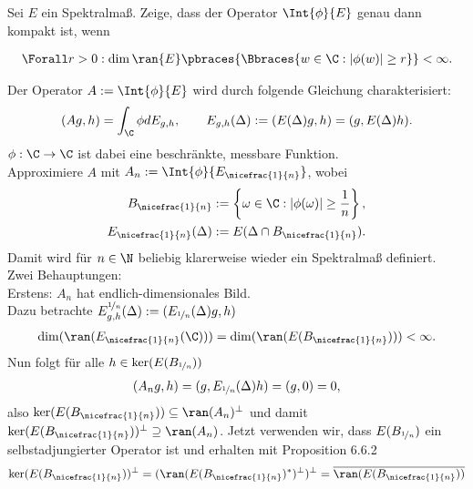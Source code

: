 \begin{exercise}[34/1]

Sei $E$ ein Spektralmaß.
Zeige, dass der Operator $\Int{\phi}{E}$ genau dann kompakt ist, wenn

\begin{align*}
  \Forall r > 0:
  \dim{\ran{E}}
  \pbraces
  {
    \Bbraces
    {
      w \in \C:
      |\phi(w)| \geq r
    }
  }
  < \infty.
\end{align*}

\end{exercise}

\begin{solution}
Der Operator $A := \Int{\phi}{E}$ wird durch folgende Gleichung charakterisiert:
\begin{align}
  \left(Ag,h\right) = \int_{\C}\phi dE_{g,h}, \qquad E_{g,h}(\Delta) := (E(\Delta)g,h) = (g,E(\Delta)h).
\end{align}
$\phi: \C \to \C$ ist dabei eine beschränkte, messbare Funktion. \\
Approximiere $A$ mit $A_n := \Int{\phi}{E_{\nicefrac{1}{n}}}$, wobei
\begin{align*}
  B_{\nicefrac{1}{n}} &:= \left\{\omega \in \C: |\phi(\omega)| \geq \frac{1}{n}\right\}, \\
  E_{\nicefrac{1}{n}}(\Delta) &:= E(\Delta \cap B_{\nicefrac{1}{n}}).
\end{align*}
Damit wird für $n \in \N$ beliebig klarerweise wieder ein Spektralmaß definiert. \\
Zwei Behauptungen: \\
Erstens: $A_n$ hat endlich-dimensionales Bild. \\
Dazu betrachte $E_{g,h}^{\nicefrac{1}{n}}(\Delta) := (E_{\nicefrac{1}{n}}(\Delta)g,h)$
\begin{align*}
  \dim (\ran(E_{\nicefrac{1}{n}}(\C))) = \dim (\ran(E(B_{\nicefrac{1}{n}}))) < \infty.
\end{align*}
Nun folgt für alle $h \in \ker(E(B_{\nicefrac{1}{n}}))$
\begin{align*}
  (A_ng,h) = (g,E_{\nicefrac{1}{n}}(\Delta)h) = (g,0) = 0,
\end{align*}
also $\ker(E(B_{\nicefrac{1}{n}})) \subseteq \ran(A_n)^{\bot}$ und damit
$\ker(E(B_{\nicefrac{1}{n}}))^{\bot} \supseteq \ran(A_n)$.
Jetzt verwenden wir, dass $E(B_{\nicefrac{1}{n}})$ ein selbstadjungierter
Operator ist und erhalten mit Proposition 6.6.2
\begin{align*}
  \ker(E(B_{\nicefrac{1}{n}}))^{\bot} = (\ran(E(B_{\nicefrac{1}{n}})^*)^{\bot})^{\bot} = \overline{\ran(E(B_{\nicefrac{1}{n}}))}

\end{align*}
\end{solution}
